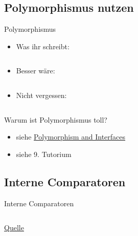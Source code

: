 \documentclass[usepdftitle=false,hyperref={pdfpagelabels=false}]{beamer}
\begin{document}
\subsection{Polymorphismus nutzen}
\begin{frame}{Polymorphismus}
    \begin{itemize}
         \item Was ihr schreibt:
               \inputminted[linenos=false, numbersep=5pt, tabsize=4, fontsize=\small, firstline=1, lastline=1]{java}{singleLines.java}
         \item Besser wäre:
               \inputminted[linenos=false, numbersep=5pt, tabsize=4, fontsize=\small, firstline=2, lastline=2]{java}{singleLines.java}
         \item Nicht vergessen:
               \inputminted[linenos=false, numbersep=5pt, tabsize=4, fontsize=\small, firstline=3, lastline=3]{java}{singleLines.java}
    \end{itemize}

    Warum ist Polymorphismus toll?
    \begin{itemize}
        \item siehe \href{http://www.artima.com/objectsandjava/webuscript/PolymorphismInterfaces1.html}{Polymorphism and Interfaces}
        \item siehe 9. Tutorium
    \end{itemize}
\end{frame}

\subsection{Interne Comparatoren}
\begin{frame}{Interne Comparatoren}
    \inputminted[linenos=true, numbersep=5pt, tabsize=4, fontsize=\tiny]{java}{InternalComparator.java}
    {\tiny \href{http://martin-thoma.com/how-to-sort-with-java/\#Internal_anonymous_Comparator}{Quelle}}
\end{frame}
\end{document}
